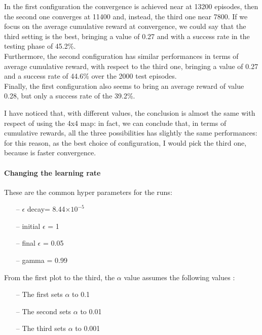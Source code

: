 \documentclass{article}
\begin{document}
\clearpage

In the first configuration the convergence is achieved near at 13200 episodes, then the second one converges at 11400 and, instead, the third one near 7800.
If we focus on the average cumulative reward at convergence, we could say that the third setting is the best, bringing a value of 0.27 and with a success rate in the testing phase of 45.2\%.
\\
Furthermore, the second configuration has similar performances in terms of average cumulative reward, with respect to the third one, bringing a value of 0.27 and a success rate of 44.6\% over the 2000 test episodes.
\\
Finally, the first configuration also seems to bring an average reward of value 0.28, but only a success rate of the 39.2\%.

I have noticed that, with different values, the conclusion is almost the same with respect of using the 4x4 map: in fact, we can conclude that, in terms of cumulative rewards, all the three possibilities has slightly the same performances:
\\
for this reason, as the best choice of configuration, I would pick the third one, because is faster convergence.




\paragraph{Changing the learning rate}


These are the common hyper parameters for the runs:
\begin{itemize}
\item[--] $\epsilon$ decay= 8.44$\times10^{-5}$
\item[--] initial $\epsilon$ = 1
\item[--] final $\epsilon$ = 0.05
\item[--] gamma = 0.99
\end{itemize}

From the first plot to the third, the $\alpha$ value assumes the following values :
\begin{itemize}
\item[--] The first sets $\alpha$ to 0.1
\item[--] The second sets $\alpha$ to 0.01
\item[--] The third sets $\alpha$ to 0.001
\end{itemize}

\clearpage
\end{document}

